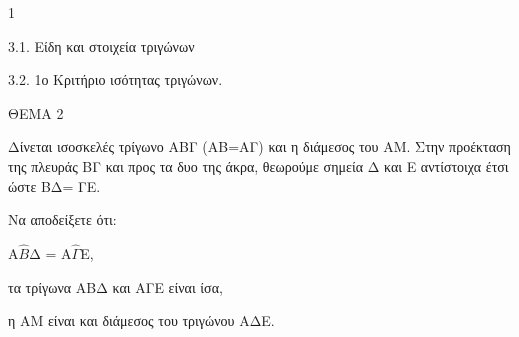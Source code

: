 \begin{ylh}{1}
    \item 3.1. Είδη και στοιχεία τριγώνων
    \item 3.2. 1ο Κριτήριο ισότητας τριγώνων.
\end{ylh}

ΘΕΜΑ 2

Δίνεται ισοσκελές τρίγωνο ΑΒΓ (ΑΒ=ΑΓ) και η διάμεσος του ΑΜ. Στην προέκταση της πλευράς ΒΓ και προς τα δυο της άκρα, θεωρούμε σημεία Δ και Ε αντίστοιχα έτσι ώστε ΒΔ= ΓΕ.

Να αποδείξετε ότι:

\begin{alist}
\item Α$\widehat{Β}$Δ = Α$\widehat{\Gamma}$Ε, 

\item τα τρίγωνα ΑΒΔ και ΑΓΕ είναι ίσα, 

\item η ΑΜ είναι και διάμεσος του τριγώνου ΑΔΕ. 


\begin{center}
\end{center}
\end{alist}
